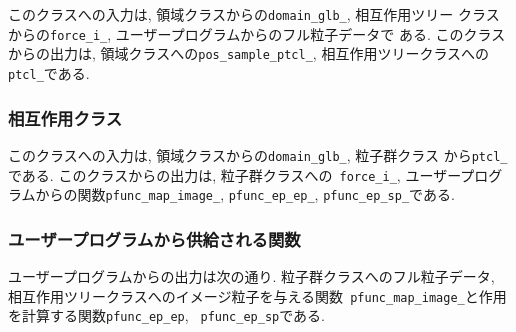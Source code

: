 \documentclass[12pt,a4paper]{jarticle}
\begin{document}

このクラスへの入力は, 領域クラスからの{\tt domain\_glb\_}, 相互作用ツリー
クラスからの{\tt force\_i\_}, ユーザープログラムからのフル粒子データで
ある. このクラスからの出力は, 領域クラスへの{\tt pos\_sample\_ptcl\_},
相互作用ツリークラスへの{\tt ptcl\_}である.

\subsubsection{相互作用クラス}
\label{sec:brief_interface_tree_for_force}

このクラスへの入力は, 領域クラスからの{\tt domain\_glb\_}, 粒子群クラス
から{\tt ptcl\_}である. このクラスからの出力は, 粒子群クラスへの{\tt
  force\_i\_}, ユーザープログラムからの関数{\tt pfunc\_map\_image\_},
{\tt pfunc\_ep\_ep\_}, {\tt pfunc\_ep\_sp\_}である.

\subsubsection{ユーザープログラムから供給される関数}

ユーザープログラムからの出力は次の通り. 粒子群クラスへのフル粒子データ,
相互作用ツリークラスへのイメージ粒子を与える関数{\tt
  pfunc\_map\_image\_}と作用を計算する関数{\tt pfunc\_ep\_ep}, {\tt
  pfunc\_ep\_sp}である.

\newpage





\end{document}
